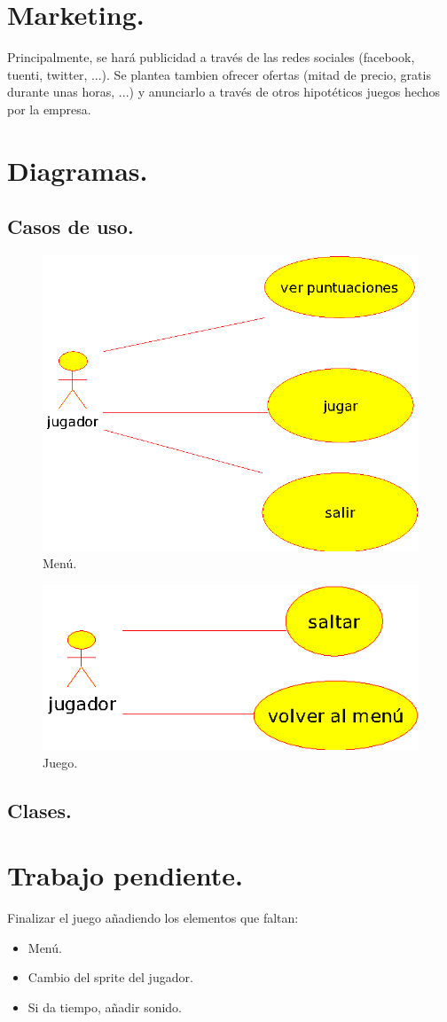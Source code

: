 \documentclass[12 pt, a4paper, twoside]{article}
\begin{document}
\section{Marketing.}

Principalmente, se hará publicidad a través de las redes sociales (facebook,
tuenti, twitter, ...). Se plantea tambien ofrecer ofertas (mitad de precio,
gratis durante unas horas, ...) y anunciarlo a través de otros hipotéticos
juegos hechos por la empresa.

\clearpage

\section{Diagramas.}

\subsection{Casos de uso.}

\begin{figure}[h]
\centering
\includegraphics[width = 10 cm]{casos_de_uso_(menu).eps}
\caption{Menú.}
\end{figure}

\begin{figure}[h]
\centering
\includegraphics[width = 10 cm]{casos_de_uso_(juego).eps}
\caption{Juego.}
\end{figure}

\subsection{Clases.}



\section{Trabajo pendiente.}

Finalizar el juego añadiendo los elementos que faltan:

\begin{itemize}
  \item Menú.
  \item Cambio del sprite del jugador.
  \item Si da tiempo, añadir sonido.
\end{itemize}
\end{document}
